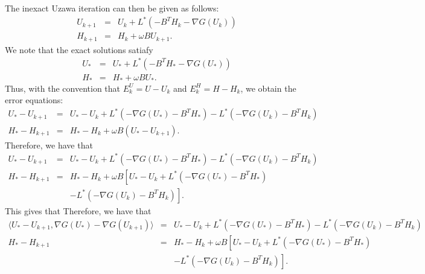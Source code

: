 The inexact Uzawa iteration can then be given as follows: 
\begin{eqnarray*}
U_{k+1} &=& U_k + L^{*} (-B^T H_k - \nabla G(U_k)) \\
H_{k+1} &=& H_k + \omega B U_{k+1}. 
\end{eqnarray*}
We note that the exact solutions satiafy 
\begin{eqnarray*}
U_{*} &=& U_{*} + L^{*} (-B^T H_{*}-\nabla G (U_{*})) \\
H_{*} &=& H_{*} + \omega B U_{*}. 
\end{eqnarray*}
Thus, with the convention that $E_{k}^U = U - U_k$ and $E_{k}^H = H - H_k$, we obtain the error equations: 
\begin{eqnarray*}
U_* - U_{k+1} &=& U_* - U_k + L^{*} (-\nabla G(U_*) -B^T H_*) - L^{*} (-\nabla G(U_k) -B^T H_k)  \\
H_* - H_{k+1} &=& H_* - H_k + \omega B (U_* - U_{k+1}). 
\end{eqnarray*}
Therefore, we have that 
\begin{eqnarray*}
U_* - U_{k+1} &=& U_* - U_k + L^{*} (-\nabla G(U_*) -B^T H_*) - L^{*} (-\nabla G(U_k) -B^T H_k)  \\
H_* - H_{k+1} &=& H_* - H_k + \omega B \left [U_* - U_k + L^{*} (-\nabla G(U_*) -B^T H_*) \right. \\
&& \left. - L^{*} (-\nabla G(U_k) -B^T H_k) \right ]. 
\end{eqnarray*}
This gives that 
Therefore, we have that 
\begin{eqnarray*}
\langle U_* - U_{k+1}, \nabla G(U_*) - \nabla G(U_{k+1}) \rangle &=& U_* - U_k + L^{*} (-\nabla G(U_*) -B^T H_*) - L^{*} (-\nabla G(U_k) -B^T H_k)  \\
H_* - H_{k+1} &=& H_* - H_k + \omega B \left [U_* - U_k + L^{*} (-\nabla G(U_*) -B^T H_*) \right. \\
&& \left. - L^{*} (-\nabla G(U_k) -B^T H_k) \right ]. 
\end{eqnarray*}




